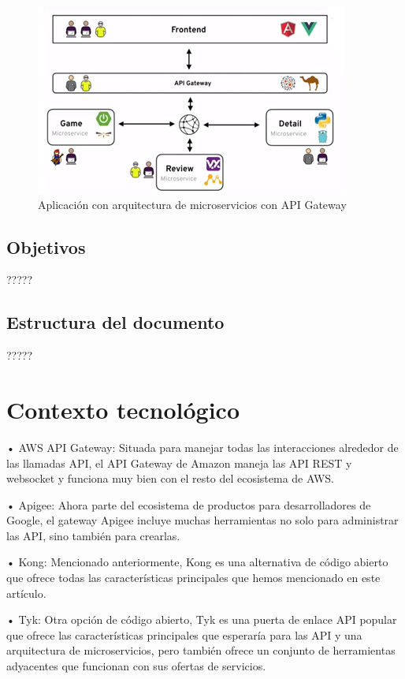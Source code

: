 \documentclass[11pt,spanish,listoffigures]{tfgetsinf}
\begin{document}
\begin{figure}
	\centering
	\includegraphics{images/b}
	\caption{Aplicación con arquitectura de microservicios con API Gateway}
\end{figure}

\section{Objetivos}

?????

\section{Estructura del documento}

?????


\chapter{Contexto tecnológico}

•	AWS API Gateway: Situada para manejar todas las interacciones alrededor de las llamadas API, el API Gateway de Amazon maneja las API REST y websocket y funciona muy bien con el resto del ecosistema de AWS.

•	Apigee: Ahora parte del ecosistema de productos para desarrolladores de Google, el gateway Apigee incluye muchas herramientas no solo para administrar las API, sino también para crearlas.

•	Kong: Mencionado anteriormente, Kong es una alternativa de código abierto que ofrece todas las características principales que hemos mencionado en este artículo.

•	Tyk: Otra opción de código abierto, Tyk es una puerta de enlace API popular que ofrece las características principales que esperaría para las API y una arquitectura de microservicios, pero también ofrece un conjunto de herramientas adyacentes que funcionan con sus ofertas de servicios.
\end{document}
